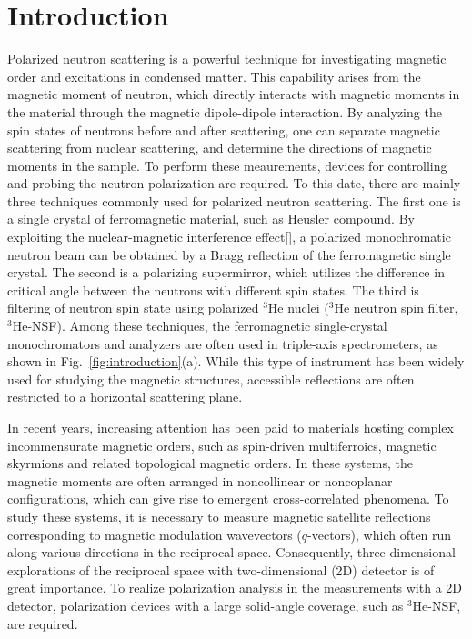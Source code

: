 \documentclass[%
 reprint,
superscriptaddress,
 amsmath,amssymb,
 aps,
floatfix,
]{revtex4-2}
\newcommand{\He}{$^3$He }
\newcommand{\Hensf}{$^3$He-NSF}
\begin{document}
\section{Introduction}
Polarized neutron scattering is a powerful technique for investigating magnetic order and excitations in condensed matter. 
This capability arises from the magnetic moment of neutron, which directly interacts with magnetic moments in the material through the magnetic dipole-dipole interaction. 
By analyzing the spin states of neutrons before and after scattering, one can separate magnetic scattering from nuclear scattering, and determine the directions of magnetic moments in the sample. 
To perform these meaurements, devices for controlling and probing the neutron polarization are required.
To this date, there are mainly three techniques commonly used for polarized neutron scattering.
The first one is a single crystal of ferromagnetic material, such as  Heusler compound. 
By exploiting the nuclear-magnetic interference effect[], a polarized monochromatic neutron beam can be obtained by a Bragg reflection of the ferromagnetic single crystal.  
The second is a polarizing supermirror, which utilizes the difference in critical angle between the neutrons with different spin states. 
The third is filtering of neutron spin state using polarized \He nuclei (\He neutron spin filter, \Hensf).
Among these techniques, the ferromagnetic single-crystal monochromators and analyzers are often used in triple-axis spectrometers\cite{kulda_in20_2002,faulhaber_polarized_2010,fernandez-baca_triple-axis_2008,takeda_double_2008,nakajima_polarized_2024}, as shown in Fig.~\ref{fig:introduction}(a).
While this type of instrument has been widely used for studying the magnetic structures, accessible reflections are often restricted to a horizontal scattering plane.

In recent years, increasing attention has been paid to materials hosting complex incommensurate magnetic orders, such as spin-driven multiferroics, magnetic skyrmions and related topological magnetic orders\cite{muhlbauer_skyrmion_2009,tokura_multiferroics_2014,kanazawa_direct_2020,fujishiro_topological_2019,kurumaji_electronic_2025}.
In these systems, the magnetic moments are often arranged in noncollinear or noncoplanar configurations, which can give rise to emergent cross-correlated phenomena.
To study these systems, it is necessary to measure magnetic satellite reflections corresponding to magnetic modulation wavevectors ($q$-vectors), which often run along various directions in the reciprocal space. 
Consequently, three-dimensional explorations of the reciprocal space with two-dimensional (2D) detector is of great importance.  
To realize polarization analysis in the measurements with a 2D detector, polarization devices with a large solid-angle coverage, such as \Hensf, are required.
\end{document}
